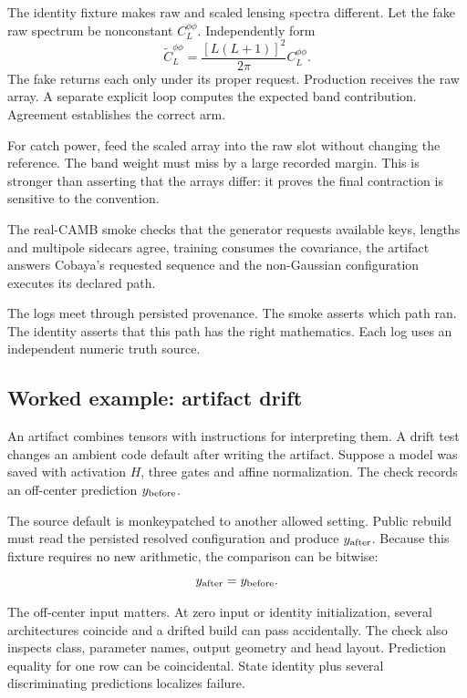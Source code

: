 \documentclass[10pt,aps,prd,twocolumn,nofootinbib]{revtex4-2}
\begin{document}
The identity fixture makes raw and scaled lensing spectra different.  Let the
fake raw spectrum be nonconstant \(C_L^{\phi\phi}\).  Independently form
\begin{equation*}
 \widetilde C_L^{\phi\phi}
 =\frac{[L(L+1)]^2}{2\pi}C_L^{\phi\phi}.
\end{equation*}
The fake returns each only under its proper request.  Production receives the
raw array.  A separate explicit loop computes the expected band contribution.
Agreement establishes the correct arm.

For catch power, feed the scaled array into the raw slot without changing the
reference.  The band weight must miss by a large recorded margin.  This is
stronger than asserting that the arrays differ: it proves the final
contraction is sensitive to the convention.

The real-CAMB smoke checks that the generator requests available keys, lengths
and multipole sidecars agree, training consumes the covariance, the artifact
answers Cobaya's requested sequence and the non-Gaussian configuration
executes its declared path.

The logs meet through persisted provenance.  The smoke asserts which path
ran.  The identity asserts that this path has the right mathematics.  Each log
uses an independent numeric truth source.

\subsection{Worked example: artifact drift}

An artifact combines tensors with instructions for interpreting them.  A
drift test changes an ambient code default after writing the artifact.
Suppose a model was saved with activation \(H\), three gates and affine
normalization.  The check records an off-center prediction
\(y_{\rm before}\).

The source default is monkeypatched to another allowed setting.  Public
rebuild must read the persisted resolved configuration and produce
\(y_{\rm after}\).  Because this fixture requires no new arithmetic, the
comparison can be bitwise:
\begin{equation*}
  y_{\rm after}=y_{\rm before}.
\end{equation*}

The off-center input matters.  At zero input or identity initialization,
several architectures coincide and a drifted build can pass accidentally.
The check also inspects class, parameter names, output geometry and head
layout.  Prediction equality for one row can be coincidental.  State identity
plus several discriminating predictions localizes failure.
\end{document}
